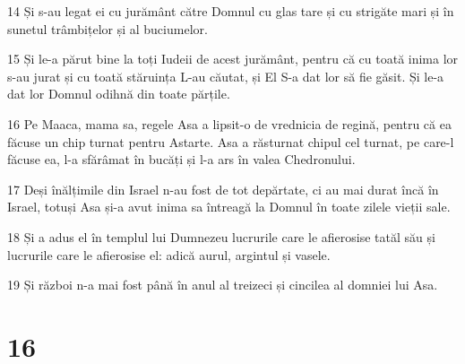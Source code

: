 \par 14 Și s-au legat ei cu jurământ către Domnul cu glas tare și cu strigăte mari și în sunetul trâmbițelor și al buciumelor.
\par 15 Și le-a părut bine la toți Iudeii de acest jurământ, pentru că cu toată inima lor s-au jurat și cu toată stăruința L-au căutat, și El S-a dat lor să fie găsit. Și le-a dat lor Domnul odihnă din toate părțile.
\par 16 Pe Maaca, mama sa, regele Asa a lipsit-o de vrednicia de regină, pentru că ea făcuse un chip turnat pentru Astarte. Asa a răsturnat chipul cel turnat, pe care-l făcuse ea, l-a sfărâmat în bucăți și l-a ars în valea Chedronului.
\par 17 Deși înălțimile din Israel n-au fost de tot depărtate, ci au mai durat încă în Israel, totuși Asa și-a avut inima sa întreagă la Domnul în toate zilele vieții sale.
\par 18 Și a adus el în templul lui Dumnezeu lucrurile care le afierosise tatăl său și lucrurile care le afierosise el: adică aurul, argintul și vasele.
\par 19 Și război n-a mai fost până în anul al treizeci și cincilea al domniei lui Asa.

\chapter{16}

